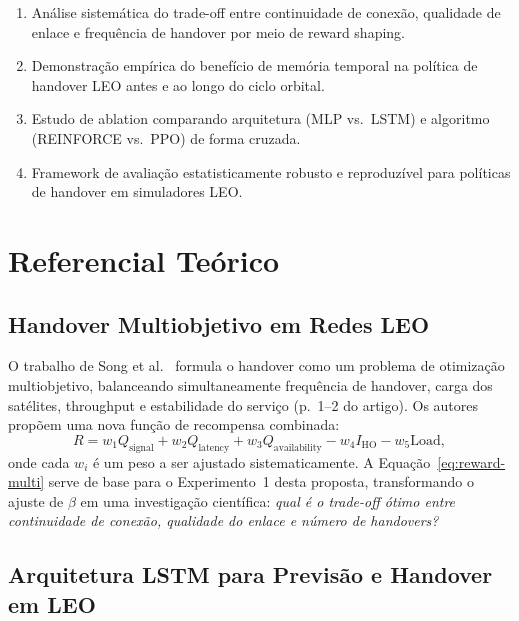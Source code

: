 \documentclass[12pt,a4paper]{article}
\begin{document}
\begin{enumerate}
  \item Análise sistemática do trade-off entre continuidade de conexão,
        qualidade de enlace e frequência de handover por meio de reward shaping.
  \item Demonstração empírica do benefício de memória temporal na política de
        handover LEO antes e ao longo do ciclo orbital.
  \item Estudo de ablation comparando arquitetura (MLP vs.\ LSTM) e algoritmo
        (REINFORCE vs.\ PPO) de forma cruzada.
  \item Framework de avaliação estatisticamente robusto e reproduzível para
        políticas de handover em simuladores LEO.
\end{enumerate}

\section{Referencial Teórico}

\subsection{Handover Multiobjetivo em Redes LEO}

O trabalho de Song et al.~\cite{song2025} formula o handover como um problema
de otimização multiobjetivo, balanceando simultaneamente frequência de handover,
carga dos satélites, throughput e estabilidade do serviço (p.~1--2 do artigo).
Os autores propõem uma nova função de recompensa combinada:
\begin{equation}
  R = w_1 Q_{\text{signal}}
    + w_2 Q_{\text{latency}}
    + w_3 Q_{\text{availability}}
    - w_4 I_{\text{HO}}
    - w_5 \text{Load},
  \label{eq:reward-multi}
\end{equation}
onde cada $w_i$ é um peso a ser ajustado sistematicamente. A
Equação~\eqref{eq:reward-multi} serve de base para o Experimento~1 desta
proposta, transformando o ajuste de $\beta$ em uma investigação científica:
\textit{qual é o trade-off ótimo entre continuidade de conexão, qualidade do
enlace e número de handovers?}

\subsection{Arquitetura LSTM para Previsão e Handover em LEO}
\end{document}
